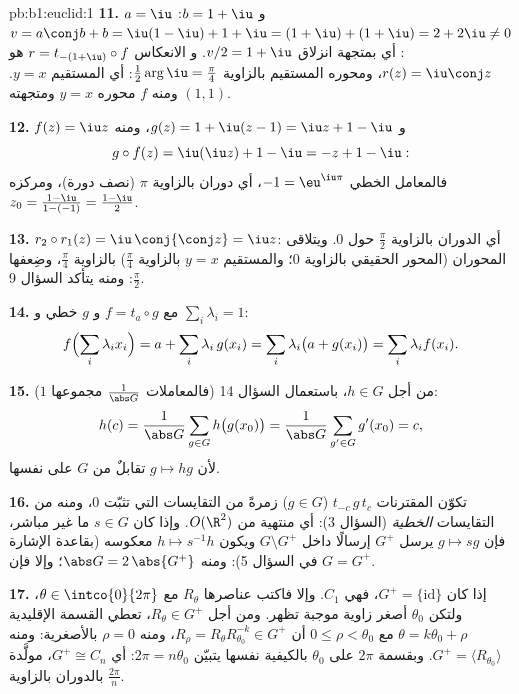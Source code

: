 \begin{solution}{pb:b1:euclid:1}
\textbf{11.} $a = \iu$ و $b = 1 + \iu$: $v = a\conj b + b =
\iu(1 - \iu) + 1 + \iu = (1 + \iu) + (1 + \iu) = 2 + 2\iu \neq
0$: أي  بمتجهة انزلاق $v/2 = 1 + \iu$. و
الانعكاس $r = t_{-(1+\iu)}\circ f$ هو $r(z) = \iu\conj z$،
ومحوره المستقيم بالزاوية $\frac12\arg\iu = \frac\pi4$:
أي المستقيم $y = x$. ومنه  $f$  محوره $y =
x$ ومتجهته $(1, 1)$.

\textbf{12.} $f(z) = \iu z$ و $g(z) = 1 + \iu(z - 1) = \iu z
+ 1 - \iu$، ومنه
\[
g\circ f(z) = \iu(\iu z) + 1 - \iu = -z + 1 - \iu :
\]
فالمعامل الخطي $-1 = \eu^{\iu\pi}$، أي دوران بالزاوية
$\pi$ (نصف دورة)، ومركزه $z_0 = \frac{1 - \iu}{1 - (-1)}
= \frac{1 - \iu}{2}$.

\textbf{13.} $r_2\circ r_1(z) = \iu\,\conj{\conj z} = \iu z$:
أي الدوران بالزاوية $\frac\pi2$ حول $0$. ويتلاقى المحوران (المحور
الحقيقي بالزاوية $0$؛ والمستقيم $y = x$ بالزاوية $\frac\pi4$) بالزاوية
$\frac\pi4$، وضِعفها $\frac\pi2$: ومنه يتأكد السؤال 9.

\textbf{14.} مع $f = t_a\circ g$ و $g$ خطي و $\sum_i
\lambda_i = 1$:
\[
f\Bigl(\sum_i \lambda_i x_i\Bigr)
= a + \sum_i \lambda_i\,g(x_i)
= \sum_i \lambda_i\bigl(a + g(x_i)\bigr)
= \sum_i \lambda_i f(x_i) .
\]

\textbf{15.} من أجل $h \in G$، باستعمال السؤال 14 (فالمعاملات
$\frac1{\abs G}$ مجموعها $1$):
\[
h(c) = \frac{1}{\abs G}\sum_{g \in G} h\bigl(g(x_0)\bigr)
= \frac{1}{\abs G}\sum_{g' \in G} g'(x_0) = c ,
\]
لأن $g \mapsto hg$ تقابلٌ من $G$ على نفسها.

\textbf{16.} تكوّن المقترنات $t_{-c}\,g\,t_{c}$ ($g \in G$)
زمرةً من التقايسات التي تثبّت $0$، ومنه من التقايسات
\emph{الخطية} (السؤال 3): أي  منتهية من $O(\R^2)$. وإذا كان
$s \in G$ ما غير مباشر، فإن  $g \mapsto sg$ يرسل $G^+$
إرسالًا  داخل $G\setminus G^+$ ويكون $h \mapsto s^{-1}h$
معكوسه (بقاعدة الإشارة في السؤال 5): ومنه $\abs G = 2\,\abs{G^+}$؛
وإلا فإن $G = G^+$.

\textbf{17.} إذا كان $G^{+} = \{\mathrm{id}\}$، فهي $C_1$.
وإلا فاكتب عناصرها $R_\theta$ مع $\theta \in
\intco{0}{2\pi}$، ولتكن $\theta_0$ أصغر زاوية
موجبة تظهر. ومن أجل $R_\theta \in G^{+}$، تعطي القسمة الإقليدية
$\theta = k\theta_0 + \rho$ مع $0 \leq \rho < \theta_0$ أن
$R_\rho = R_\theta R_{\theta_0}^{-k} \in G^{+}$، ومنه $\rho = 0$
بالأصغرية: ومنه $G^{+} = \langle R_{\theta_0}\rangle$. وبقسمة
$2\pi$ على $\theta_0$ بالكيفية نفسها يتبيّن $2\pi = n\theta_0$:
أي $G^{+} \cong C_n$، مولَّدة بالدوران بالزاوية
$\frac{2\pi}n$.


\end{solution}
